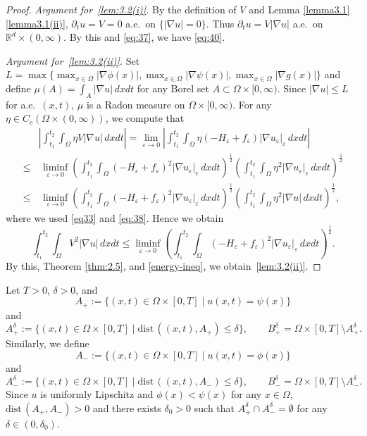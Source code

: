 \documentclass{amsart}
\theoremstyle{definition}
\def\R{{\mathbb{R}}}
\newcommand{\dist}{\mathrm{dist}\,}
\begin{document}
\begin{proof}
\emph{Argument for~\eqref{lem:3.2(i)}.}
By the definition of $V$ and Lemma \ref{lemma3.1}\eqref{lemma3.1(ii)}, 
$\partial _ t u = V =0$ a.e.\ on $\{ |\nabla u| =0\}$. Thus $\partial _t u = V|\nabla u|$ a.e.\ on $\R^d \times (0,\infty)$.
By this and \eqref{eq:37}, we have \eqref{eq:40}.

\emph{Argument for~\eqref{lem:3.2(ii)}.}
Set $L= \max \{  
    \max_{x \in \Omega} |\nabla \phi (x)|,
    \max_{x \in \Omega} |\nabla \psi (x)|,    
    \max_{x \in \Omega } |\nabla g (x)| \}
$ and define $\mu (A) = \int_A |\nabla u| \, dxdt$ for any 
Borel set $A \subset \Omega \times [0,\infty)$. 
Since 
$   
    | \nabla u|
    \leq L
$ for a.e.\ $(x,t)$, $\mu$ is a Radon measure on $\Omega \times [0,\infty)$.
For any $\eta \in C_c (\Omega \times (0,\infty))$, we compute that
\begin{equation}
\begin{split}
& \left| 
\int_{t_1} ^{t_2} \int_{\Omega} \eta V |\nabla u| \, dxdt 
\right|
=
\lim_{\varepsilon \to 0} \left| 
\int_ {t_1} ^{t_2} \int_{\Omega} \eta (-H_\varepsilon + f_\varepsilon ) |\nabla u_\varepsilon |_\varepsilon \, dxdt
\right| \\
\leq & \, 
\liminf_{\varepsilon \to 0} 
\left( \int_{t_1} ^{t_2} \int_{\Omega} ( -H_\varepsilon + f_\varepsilon)^2 |\nabla u_\varepsilon|_\varepsilon 
\, dx dt \right)^{\frac12}
\left( \int_{t_1} ^{t_2} \int_{\Omega} \eta^2 |\nabla u_\varepsilon|_\varepsilon 
\, dx dt \right)^{\frac12} \\
\leq & \,  
\liminf_{\varepsilon \to 0} 
\left( \int_{t_1} ^{t_2} \int_{\Omega} ( -H_\varepsilon + f_\varepsilon)^2 |\nabla u_\varepsilon|_\varepsilon 
\, dx dt \right)^{\frac12}
\left( \int_{t_1} ^{t_2} \int_\Omega \eta ^2 |\nabla u| \, dx dt
\right)^{\frac12},
\end{split}
\end{equation}
where we used \eqref{eq33} and \eqref{eq:38}. Hence we obtain
\[
\int_{t_1} ^{t_2}
\int_\Omega V^2 |\nabla u| \, dxdt
\leq  
\liminf_{\varepsilon \to 0} 
\left( \int_{t_1} ^{t_2} \int_{\Omega} ( -H_\varepsilon + f_\varepsilon)^2 |\nabla u_\varepsilon|_\varepsilon 
\, dx dt \right)^{\frac12}.
\]
By this, Theorem \ref{thm:2.5}, and \eqref{energy-ineq}, we obtain~\eqref{lem:3.2(ii)}.
\end{proof}

Let $T>0$, $\delta >0$, and
\[
A_ + := \{ (x,t) \in \Omega \times [0,T] \mid u(x,t) = \psi (x) \}
\] 
and 
\[
A_+^\delta := \{ (x,t) \in \Omega \times [0,T] \mid \dist ((x,t), A_+) \leq \delta \},
\qquad B_+ ^\delta = \Omega \times [0,T] \setminus A_+^\delta.
\]
Similarly, we define
\[
A_ - := \{ (x,t) \in \Omega \times [0,T] \mid u(x,t) = \phi (x) \}
\] 
and 
\[
A_-^\delta := \{ (x,t) \in \Omega \times [0,T] \mid \dist ((x,t), A_-) \leq \delta \},
\qquad B_- ^\delta = \Omega \times [0,T] \setminus A_- ^\delta.
\]
Since $u$ is uniformly Lipschitz and $\phi (x) < \psi (x)$ for any $x \in \Omega$,
$\dist (A_+,A_-)>0$ and there exists $\delta_0 >0$ such that $A_+ ^\delta \cap A_- ^\delta =\emptyset$ for any $\delta \in (0,\delta_0)$.
\end{document}
